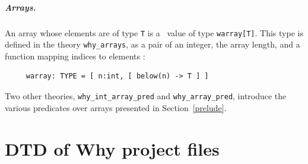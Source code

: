 \documentclass[a4paper,12pt]{report}
\begin{document}
\paragraph{Arrays.} An array whose elements are of type \texttt{T} is a
\pvs\ value of type \texttt{warray[T]}. This type is defined in the
theory \texttt{why\_arrays}, as
a pair of an integer, the array length, and a function mapping
indices to elements :
\begin{verbatim}
     warray: TYPE = [ n:int, [ below(n) -> T ] ]
\end{verbatim}
Two other theories, \texttt{why\_int\_array\_pred} and
\texttt{why\_array\_pred}, introduce the various predicates over
arrays presented in Section~\ref{prelude}.

\appendix
\chapter{DTD of Why project files}




\nocite{*}





\newpage
{}
\printindex
\end{document}
